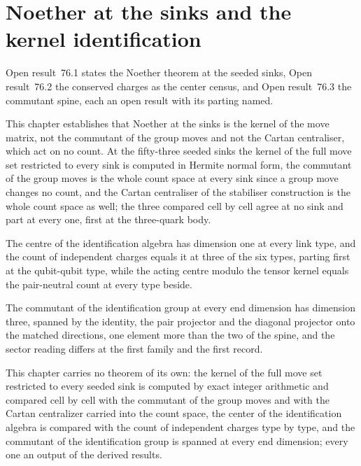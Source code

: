 \section{Noether at the sinks and the kernel identification}\label{mod:IV-7-noether-at-the-sinks-and-the-kernel-identification}
\label{narr:open:4-7}Open result~76.1 states the Noether theorem at the seeded sinks, Open result~76.2 the conserved charges as the center census, and Open result~76.3 the commutant spine, each an open result with its parting named.
\begin{chwall}\label{box:IV-7-noether-at-the-sinks-and-the-kernel-identification:1}
This chapter establishes that Noether at the sinks is the kernel of the move matrix, not the commutant of the group moves and not the Cartan centraliser, which act on no count. At the fifty-three seeded sinks the kernel of the full move set restricted to every sink is computed in Hermite normal form, the commutant of the group moves is the whole count space at every sink since a group move changes no count, and the Cartan centraliser of the stabiliser construction is the whole count space as well; the three compared cell by cell agree at no sink and part at every one, first at the three-quark body.
\end{chwall}
\begin{chwall}\label{box:IV-7-noether-at-the-sinks-and-the-kernel-identification:2}
The centre of the identification algebra has dimension one at every link type, and the count of independent charges equals it at three of the six types, parting first at the qubit-qubit type, while the acting centre modulo the tensor kernel equals the pair-neutral count at every type beside.
\end{chwall}
\begin{chwall}\label{box:IV-7-noether-at-the-sinks-and-the-kernel-identification:3}
The commutant of the identification group at every end dimension has dimension three, spanned by the identity, the pair projector and the diagonal projector onto the matched directions, one element more than the two of the spine, and the sector reading differs at the first family and the first record.
\end{chwall}
This chapter carries no theorem of its own: the kernel of the full move set restricted to every seeded sink is computed by exact integer arithmetic and compared cell by cell with the commutant of the group moves and with the Cartan centralizer carried into the count space, the center of the identification algebra is compared with the count of independent charges type by type, and the commutant of the identification group is spanned at every end dimension; every one an output of the derived results.

